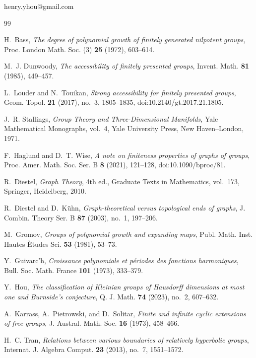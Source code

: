 \documentclass[11pt]{article}
\theoremstyle{definition}
\begin{document}
henry.yhou@gmail.com
\begin{thebibliography}{99}

H.~Bass,
\emph{The degree of polynomial growth of finitely generated nilpotent groups},
Proc. London Math. Soc. (3) \textbf{25} (1972), 603--614.

M.~J. Dunwoody,
\emph{The accessibility of finitely presented groups},
Invent. Math. \textbf{81} (1985), 449--457.

L.~Louder and N.~Touikan,
\emph{Strong accessibility for finitely presented groups},
Geom. Topol. \textbf{21} (2017), no.~3, 1805--1835,
doi:10.2140/gt.2017.21.1805.

J.~R. Stallings,
\emph{Group Theory and Three-Dimensional Manifolds},
Yale Mathematical Monographs, vol.~4, Yale University Press, New Haven--London, 1971.

F.~Haglund and D.~T. Wise,
\emph{A note on finiteness properties of graphs of groups},
Proc. Amer. Math. Soc. Ser. B \textbf{8} (2021), 121--128,
doi:10.1090/bproc/81.

R.~Diestel,
\emph{Graph Theory}, 4th ed.,
Graduate Texts in Mathematics, vol.~173, Springer, Heidelberg, 2010.

R.~Diestel and D.~K\"uhn,
\emph{Graph-theoretical versus topological ends of graphs},
J. Combin. Theory Ser. B \textbf{87} (2003), no.~1, 197--206.

M.~Gromov,
\emph{Groups of polynomial growth and expanding maps},
Publ. Math. Inst. Hautes \`Etudes Sci. \textbf{53} (1981), 53--73.

Y.~Guivarc'h,
\emph{Croissance polynomiale et p\'eriodes des fonctions harmoniques},
Bull. Soc. Math. France \textbf{101} (1973), 333--379.

Y.~Hou,
\emph{The classification of Kleinian groups of Hausdorff dimensions at most one and
Burnside's conjecture},
Q. J. Math. \textbf{74} (2023), no.~2, 607--632.

A.~Karrass, A.~Pietrowski, and D.~Solitar,
\emph{Finite and infinite cyclic extensions of free groups},
J. Austral. Math. Soc. \textbf{16} (1973), 458--466.

H.~C. Tran,
\emph{Relations between various boundaries of relatively hyperbolic groups},
Internat. J. Algebra Comput. \textbf{23} (2013), no.~7, 1551--1572.


\end{thebibliography}
\end{document}
